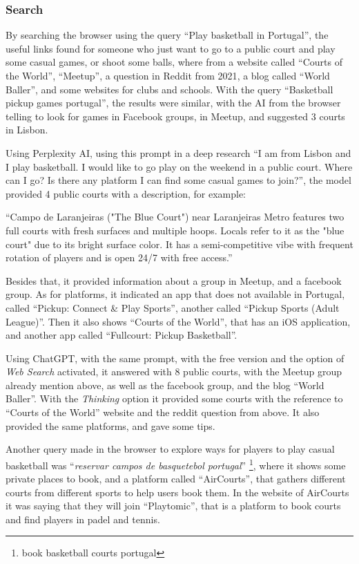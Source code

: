 \subsubsection{Search}
By searching the browser using the query ``Play basketball in Portugal'', the useful links found for someone who just want to go to a public court and play some casual games, or shoot some balls, where from a website called ``Courts of the World''\cite{fiba-courts}, ``Meetup''\cite{meetup}, a question in Reddit from 2021\cite{reddit}, a blog called ``World Baller''\cite{worldBaller}, and some websites for clubs and schools.
With the query ``Basketball pickup games portugal'', the results were similar, with the AI from the browser telling to look for games in Facebook groups, in Meetup, and suggested 3 courts in Lisbon.

Using Perplexity AI, using this prompt in a deep research ``I am from Lisbon and  I play basketball.
I would like to go play on the weekend in a public court.
Where can I go?
Is there any platform I can find some casual games to join?''\cite{perplexity}, the model provided 4 public courts with a description, for example:

``Campo de Laranjeiras ("The Blue Court") near Laranjeiras Metro features two full courts with fresh surfaces and multiple hoops.
Locals refer to it as the "blue court" due to its bright surface color.
It has a semi-competitive vibe with frequent rotation of players and is open 24/7 with free access.''

Besides that, it provided information about a group in Meetup, and a facebook group.
As for platforms, it indicated an app that does not available in Portugal, called ``Pickup: Connect \& Play Sports'', another called ``Pickup Sports (Adult League)''\cite{pickup-adult}.
Then it also shows ``Courts of the World'', that has an iOS application, and another app called ``Fullcourt: Pickup Basketball''\cite{fullcourt-pp}.

Using ChatGPT, with the same prompt, with the free version and the option of \textit{Web Search} activated, it answered with 8 public courts, with the Meetup group already mention above, as well as the facebook group, and the blog ``World Baller''\cite{chatgpt1}.
With the \textit{Thinking} option it provided some courts with the reference to ``Courts of the World'' website and the reddit question from above.
It also provided the same platforms, and gave some tips\cite{chatgpt2}.

Another query made in the browser to explore ways for players to play casual basketball was ``\textit{reservar campos de basquetebol portugal}'' \footnote{book basketball courts portugal}, where it shows some private places to book, and a platform called ``AirCourts''\cite{aircourts}, that gathers different courts from different sports to help users book them.
In the website of AirCourts it was saying that they will join ``Playtomic''\cite{playtonic}, that is a platform to book courts and find players in padel and tennis.

